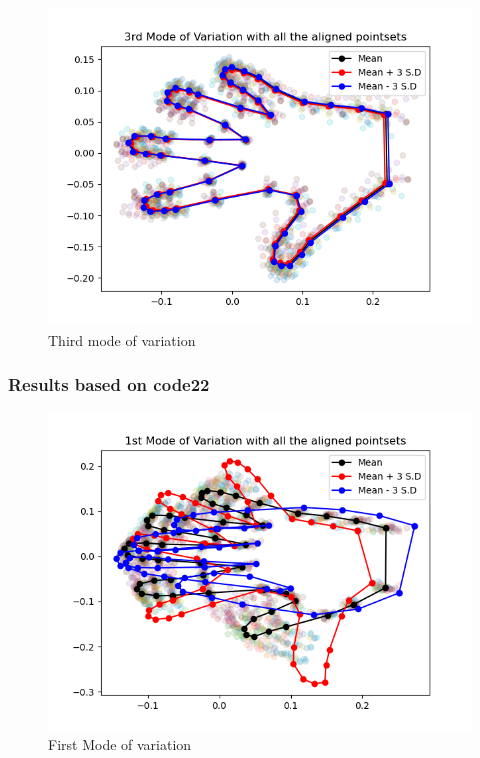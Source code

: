 \documentclass{article}
\begin{document}
\begin{figure}[H]
    \centerline{\includegraphics[scale=0.45]{../results/hand/mean-and-third-mode.png}}
    \caption{Third mode of variation}
\end{figure}

\newpage
\thispagestyle{fancy}

\subsubsection{Results based on code22}
\begin{figure}[H]
    \centerline{\includegraphics[scale=0.45]{../results/hand/mean-and-first-mode_2.png}}
    \caption{First Mode of variation }
\end{figure}
\end{document}
